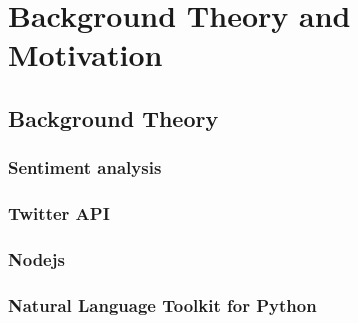 \section{Background Theory and Motivation}
	\subsection{Background Theory}
	\subsubsection{Sentiment analysis}
	\subsubsection{Twitter API}
	\subsubsection{Nodejs}
	\subsubsection{Natural Language Toolkit for Python}